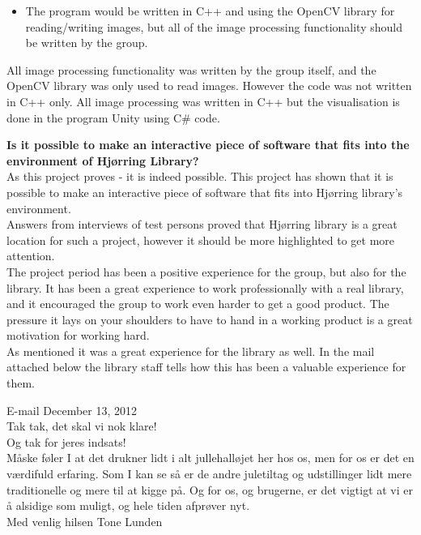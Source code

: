 \begin{itemize}
\item The program would be written in C++ and using the OpenCV library for reading/writing images, but all of the image processing functionality should be written by the group.
\end{itemize}
All image processing functionality was written by the group itself, and the OpenCV library was only used to read images. However the code was not written in C++ only. All image processing was written in C++ but the visualisation is done in the program Unity using C\# code.

\textbf{Is it possible to make an interactive piece of software that fits into the environment of Hj{\o}rring Library?}\\
As this project proves - it is indeed possible. This project has shown that it is possible to make an interactive piece of software that fits into Hj{\o}rring library's environment.\\
Answers from interviews of test persons proved that Hj{\o}rring library is a great location for such a project, however it should be more highlighted to get more attention. \\
The project period has been a positive experience for the group, but also for the library. It has been a great experience to work professionally with a real library, and it encouraged the group to work even harder to get a good product. The pressure it lays on your shoulders to have to hand in a working product is a great motivation for working hard. \\
As mentioned it was a great experience for the library as well. In the mail attached below the library staff tells how this has been a valuable experience for them.

\begin{fancyquotes}
E-mail December 13, 2012\\
Tak tak, det skal vi nok klare!\\

Og tak for jeres indsats!\\
M{\aa}ske f{\o}ler I at det drukner lidt i alt jullehall{\o}jet her hos os, men for os er det en v{\ae}rdifuld erfaring. Som I kan se s{\aa} er de andre juletiltag og udstillinger lidt mere traditionelle og mere til at kigge p{\aa}. Og for os, og brugerne, er det vigtigt at vi er {\aa} alsidige som muligt, og hele tiden afpr{\o}ver nyt.\\

Med venlig hilsen
Tone Lunden
\end{fancyquotes}

